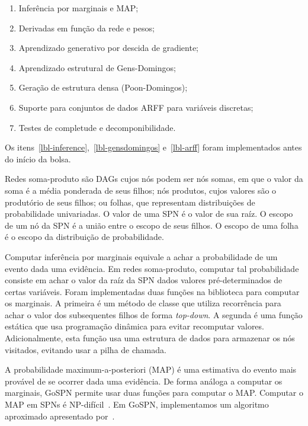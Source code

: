 \documentclass[12pt]{article}
\theoremstyle{plain}
\numberwithin{equation}{section}
\begin{document}
\begin{enumerate}
  \item Inferência por marginais e MAP;\label{lbl-inference}
  \item Derivadas em função da rede e pesos;\label{lbl-derivative}
  \item Aprendizado generativo por descida de gradiente;\label{lbl-generativegd}
  \item Aprendizado estrutural de Gens-Domingos;\label{lbl-gensdomingos}
  \item Geração de estrutura densa (Poon-Domingos);\label{lbl-dense}
  \item Suporte para conjuntos de dados ARFF para variáveis discretas;\label{lbl-arff}
  \item Testes de completude e decomponibilidade.\label{lbl-cc}
\end{enumerate}

Os itens~\ref{lbl-inference},~\ref{lbl-gensdomingos} e~\ref{lbl-arff} foram implementados antes do
início da bolsa.

Redes soma-produto são DAGs cujos nós podem ser nós somas, em que o valor da soma é a média
ponderada de seus filhos; nós produtos, cujos valores são o produtório de seus filhos; ou folhas,
que representam distribuições de probabilidade univariadas. O valor de uma SPN é o valor de sua
raíz. O escopo de um nó da SPN é a união entre o escopo de seus filhos. O escopo de uma folha é o
escopo da distribuição de probabilidade.

Computar inferência por marginais equivale a achar a probabilidade de um evento dada uma evidência.
Em redes soma-produto, computar tal probabilidade consiste em achar o valor da raíz da SPN dados
valores pré-determinados de certas variáveis. Foram implementadas duas funções na biblioteca para
computar os marginais. A primeira é um método de classe que utiliza recorrência para achar o valor
dos subsequentes filhos de forma \textit{top-down}. A segunda é uma função estática que usa
programação dinâmica para evitar recomputar valores. Adicionalmente, esta função usa uma estrutura
de dados para armazenar os nós visitados, evitando usar a pilha de chamada.

A probabilidade maximum-a-posteriori (MAP) é uma estimativa do evento mais provável de se ocorrer
dada uma evidência. De forma análoga a computar os marginais, GoSPN permite usar duas funções para
computar o MAP\@. Computar o MAP em SPNs é NP-difícil~\cite{peharz-spn,cmc2017}. Em GoSPN,
implementamos um algoritmo aproximado apresentado por~\cite{poon-domingos}.
\end{document}
